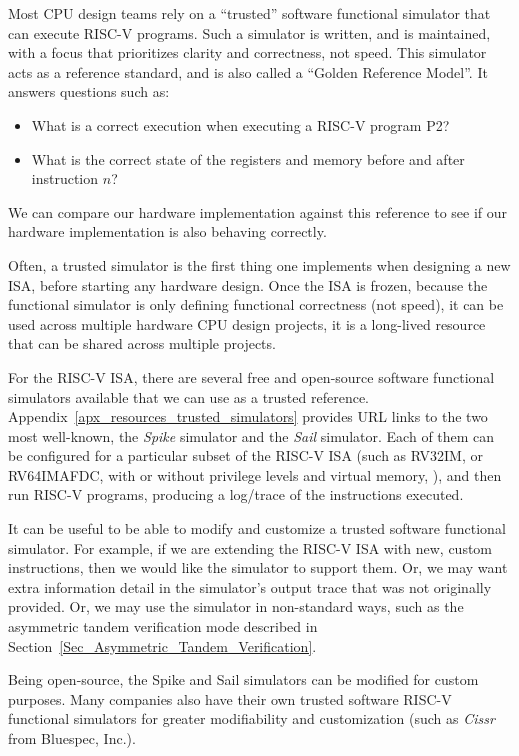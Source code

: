 Most CPU design teams rely on a ``trusted'' software functional
simulator that can execute RISC-V programs.  Such a simulator is
written, and is maintained, with a focus that prioritizes clarity and
correctness, not speed.  This simulator acts as a reference standard,
and is also called a ``Golden Reference Model''.  It answers questions
such as:

\begin{itemize}
 \item What is a correct execution when executing a RISC-V program P2?

 \item What is the correct state of the registers and memory before and after instruction $n$?
\end{itemize}

We can compare our hardware implementation against this reference to
see if our hardware implementation is also behaving correctly.

Often, a trusted simulator is the first thing one implements when
designing a new ISA, before starting any hardware design.  Once the
ISA is frozen, because the functional simulator is only defining
functional correctness (not speed), it can be used across multiple
hardware CPU design projects, {\ie} it is a long-lived resource that
can be shared across multiple projects.

For the RISC-V ISA, there are several free and open-source software
functional simulators available that we can use as a trusted
reference.  Appendix~\ref{apx_resources_trusted_simulators} provides
URL links to the two most well-known, the \emph{Spike} simulator and
the \emph{Sail} simulator.  Each of them can be configured for a
particular subset of the RISC-V ISA (such as RV32IM, or RV64IMAFDC,
with or without privilege levels and virtual memory, {\etc}), and then
run RISC-V programs, producing a log/trace of the instructions
executed.

It can be useful to be able to modify and customize a trusted software
functional simulator.  For example, if we are extending the RISC-V ISA
with new, custom instructions, then we would like the simulator to
support them.  Or, we may want extra information detail in the
simulator's output trace that was not originally provided.
Or, we may use the simulator in non-standard ways, such
as the asymmetric tandem verification mode described in
Section~\ref{Sec_Asymmetric_Tandem_Verification}.

Being open-source, the Spike and Sail simulators can be modified for
custom purposes.  Many companies also have their own trusted software
RISC-V functional simulators for greater modifiability and
customization (such as \emph{Cissr} from Bluespec, Inc.).


